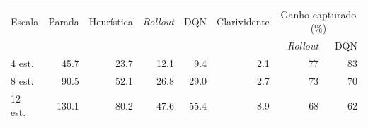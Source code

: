 \begin{tabular}{lrrrrrrr}
\toprule
Escala & Parada & Heur\'istica & \emph{Rollout} & DQN & Clarividente & \multicolumn{2}{c}{Ganho capturado (\%)} \\
\cmidrule(lr){7-8}
 & & & & & & \emph{Rollout} & DQN \\
\midrule
4 est. & 45.7 & 23.7 & 12.1 & 9.4 & 2.1 & 77 & 83 \\
8 est. & 90.5 & 52.1 & 26.8 & 29.0 & 2.7 & 73 & 70 \\
12 est. & 130.1 & 80.2 & 47.6 & 55.4 & 8.9 & 68 & 62 \\
\bottomrule
\end{tabular}
